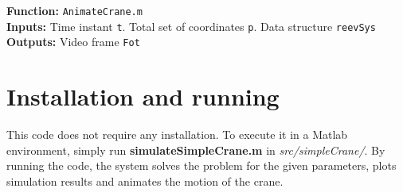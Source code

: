 \begin{tcolorbox}{\begin{lstlisting}[style=Matlab-editor]
% Animation of crane motion %
% Number of frames of the animation %
N = 100;

% Resamples the data %
t2 = t(1):(t(end)-t(1))/(N-1):t(end);
p2 = zeros(reevSys.np,N);
for i = 1:reevSys.np
    p2(i,:) = interp1(t,p(i,:),t2);
end

% Animates the motion of the system %
for i = 1:length(t2)
    Fot(i) = AnimateCrane(t2(i),p2(:,i),reevSys);
end
\end{lstlisting}}}
\end{tcolorbox}

\setlength{\parindent}{0cm}
\textbf{Function:} \texttt{AnimateCrane.m} \\
\textbf{Inputs:} Time instant \texttt{t}. Total set of coordinates \texttt{p}. Data structure \texttt{reevSys} \\
\textbf{Outputs:} Video frame \texttt{Fot} \\


\section{Installation and running}
 This code does not require any installation. To execute it in a Matlab environment, simply run \textbf{simulateSimpleCrane.m} in \textit{src/simpleCrane/}. By running the code, the system solves the problem for the given parameters, plots simulation results and animates the motion of the crane. 


\begin{comment}
\subsection{m-files description}
\texttt{CalculateAllCoordinates}: The main structure of the code can be found in 

\textbf{Parameters} The set of the coordinates of the reeving system \texttt{p}, time vector \texttt{t}, and the parameters of the system as \texttt{reevSys}.

\textbf{Returns} The animation of the simulation
\end{comment}



